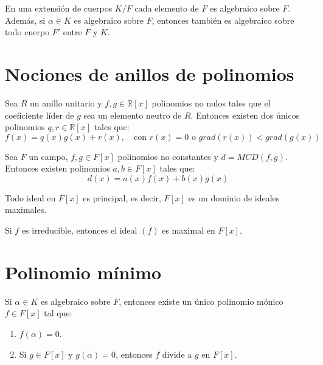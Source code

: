 \begin{remark}
    En una extensión de cuerpos $K/F$ cada elemento de $F$ es algebraico sobre $F$.
    Además, si $\alpha \in K$ es algebraico sobre $F$, entonces también es algebraico sobre todo cuerpo $F'$ entre $F$ y $K$.
\end{remark}

\section{Nociones de anillos de polinomios}

\begin{theorem}
    Sea $R$ un anillo unitario y $f, g \in \mathbb{R}[x]$ polinomios no nulos tales que el coeficiente líder de $g$ sea un elemento neutro de $R$.
    Entonces existen dos únicos polinomios $q, r \in \mathbb{R}[x]$ tales que:
    $$f(x) = q(x)g(x) + r(x), \quad\text{con } r(x)=0 \text{ o } grad(r(x)) < grad(g(x))$$
\end{theorem}

\begin{corollary}
    Sea $F$ un campo, $f, g \in F[x]$ polinomios no constantes y $d = MCD(f, g)$. Entonces existen polinomios $a, b \in F[x]$ tales que:
    $$d(x) = a(x)f(x) + b(x)g(x)$$
\end{corollary}

\begin{corollary}
    Todo ideal en $F[x]$ es principal, es decir, $F[x]$ es un dominio de ideales maximales.
\end{corollary}

\begin{corollary}
    Si $f$ es irreducible, entonces el ideal $(f)$ es maximal en $F[x]$.
\end{corollary}

\section{Polinomio mínimo}

\begin{proposition}
    Si $\alpha \in K$ es algebraico sobre $F$, entonces existe un único polinomio mónico $f \in F[x]$ tal que:
    \begin{enumerate}
        \item $f(\alpha) = 0$.
        \item Si $g \in F[x]$ y $g(\alpha) = 0$, entonces $f$ divide a $g$ en $F[x]$.
    \end{enumerate}
\end{proposition}


